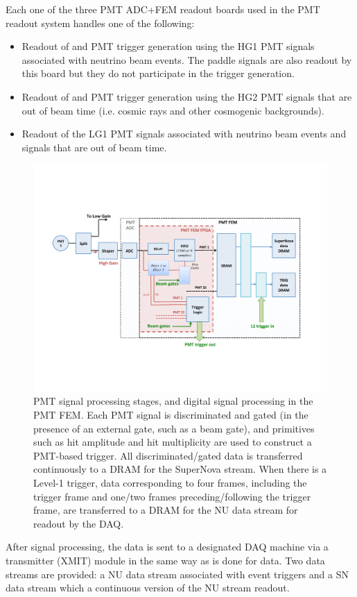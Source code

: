 Each one of the three PMT ADC+FEM readout boards used in the PMT readout system handles one of the following:

\begin{itemize}
\item Readout of and PMT trigger generation using the HG1 PMT signals associated with neutrino beam events. The paddle signals are also readout by this board but they do not participate in the trigger generation. 
\item Readout of and PMT trigger generation using the HG2 PMT signals that are out of beam time (i.e. cosmic rays and other cosmogenic backgrounds). 
\item Readout of the LG1 PMT signals associated with neutrino beam events and signals that are out of beam time.
\end{itemize}

\begin{figure}
\centering
\includegraphics[width=0.8\linewidth]{./figures/readout_7.pdf}%
\caption{\label{fig:readout_7}PMT signal processing stages, and digital signal processing in the PMT FEM. Each PMT signal is discriminated and gated (in the presence of an external gate, such as a beam gate), and primitives such as hit amplitude and hit multiplicity are used to construct a PMT-based trigger. All discriminated/gated data is transferred continuously to a DRAM for the SuperNova stream. When there is a Level-1 trigger, data corresponding to four frames, including the trigger frame and one/two frames preceding/following the trigger frame, are transferred to a DRAM for the NU data stream for readout by the DAQ.}
\end{figure}

After signal processing, the data is sent to a designated DAQ machine via a transmitter (XMIT) module in the same way as is done for \lartpc data. Two data streams are provided: a NU data stream associated with event triggers and a SN data stream which a continuous version of the NU stream readout.

